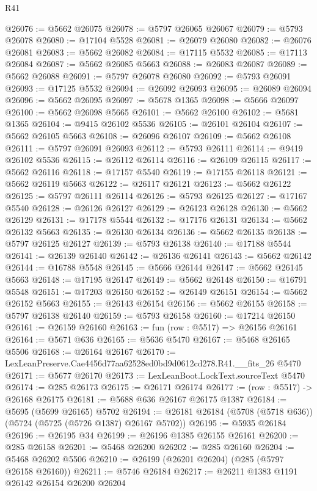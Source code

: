 \begin{lexlean}{R41}
\begin{coremodule}
@26076 := @5662 @26075
@26078 := @5797 @26065 @26067
@26079 := @5793 @26078
@26080 := @17104 @5528
@26081 := @26079 @26080
@26082 := @26076 @26081
@26083 := @5662 @26082
@26084 := @17115 @5532
@26085 := @17113 @26084
@26087 := @5662 @26085 @5663
@26088 := @26083 @26087
@26089 := @5662 @26088
@26091 := @5797 @26078 @26080
@26092 := @5793 @26091
@26093 := @17125 @5532
@26094 := @26092 @26093
@26095 := @26089 @26094
@26096 := @5662 @26095
@26097 := @5678 @1365
@26098 := @5666 @26097
@26100 := @5662 @26098 @5665
@26101 := @5662 @26100
@26102 := @5681 @1365
@26104 := @9415 @26102 @5536
@26105 := @26101 @26104
@26107 := @5662 @26105 @5663
@26108 := @26096 @26107
@26109 := @5662 @26108
@26111 := @5797 @26091 @26093
@26112 := @5793 @26111
@26114 := @9419 @26102 @5536
@26115 := @26112 @26114
@26116 := @26109 @26115
@26117 := @5662 @26116
@26118 := @17157 @5540
@26119 := @17155 @26118
@26121 := @5662 @26119 @5663
@26122 := @26117 @26121
@26123 := @5662 @26122
@26125 := @5797 @26111 @26114
@26126 := @5793 @26125
@26127 := @17167 @5540
@26128 := @26126 @26127
@26129 := @26123 @26128
@26130 := @5662 @26129
@26131 := @17178 @5544
@26132 := @17176 @26131
@26134 := @5662 @26132 @5663
@26135 := @26130 @26134
@26136 := @5662 @26135
@26138 := @5797 @26125 @26127
@26139 := @5793 @26138
@26140 := @17188 @5544
@26141 := @26139 @26140
@26142 := @26136 @26141
@26143 := @5662 @26142
@26144 := @16788 @5548
@26145 := @5666 @26144
@26147 := @5662 @26145 @5663
@26148 := @17195 @26147
@26149 := @5662 @26148
@26150 := @16791 @5548
@26151 := @17203 @26150
@26152 := @26149 @26151
@26154 := @5662 @26152 @5663
@26155 := @26143 @26154
@26156 := @5662 @26155
@26158 := @5797 @26138 @26140
@26159 := @5793 @26158
@26160 := @17214 @26150
@26161 := @26159 @26160
@26163 := fun (row : @5517) => @26156 @26161
@26164 := @5671 @636
@26165 := @5636 @5470
@26167 := @5468 @26165 @5506
@26168 := @26164 @26167
@26170 := LexLeanPreserve.Cae4456d77aa62528ed0bd9d0612cd278.R41.__fits_26 @5470
@26171 := @5677 @26170
@26173 := LexLeanBoot.LockText.sourceText @5470
@26174 := @285 @26173
@26175 := @26171 @26174
@26177 := (row : @5517) -> @26168 @26175
@26181 := @5688 @636 @26167 @26175 @1387
@26184 := @5695 (@5699 @26165) @5702
@26194 := @26181 @26184 (@5708 (@5718 @636)) (@5724 (@5725 (@5726 @1387) @26167 @5702))
@26195 := @5935 @26184
@26196 := @26195 @34
@26199 := @26196 @1385 @26155 @26161
@26200 := @285 @26158
@26201 := @5468 @26200
@26202 := @285 @26160
@26204 := @5468 @26202 @5506
@26210 := @26199 (@26201 @26204) (@285 (@5797 @26158 @26160))
@26211 := @5746 @26184
@26217 := @26211 @1383 @1191 @26142 @26154 @26200 @26204

\end{coremodule}
\end{lexlean}
